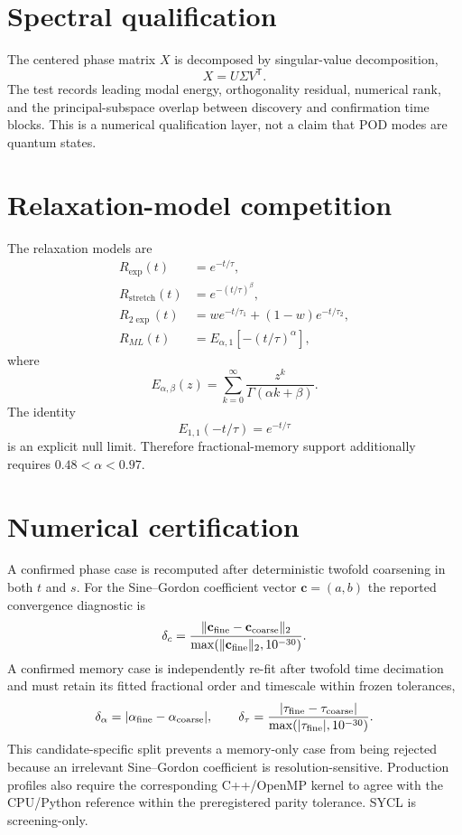 \documentclass[11pt]{article}
\begin{document}
\section{Spectral qualification}
The centered phase matrix $X$ is decomposed by singular-value decomposition,
\begin{equation}
X=U\Sigma V^{\mathsf T}.
\end{equation}
The test records leading modal energy, orthogonality residual, numerical rank, and the principal-subspace overlap between discovery and confirmation time blocks.  This is a numerical qualification layer, not a claim that POD modes are quantum states.

\section{Relaxation-model competition}
The relaxation models are
\begin{align}
R_{\exp}(t)&=e^{-t/\tau},\\
R_{\mathrm{stretch}}(t)&=e^{-(t/\tau)^\beta},\\
R_{2\exp}(t)&=w e^{-t/\tau_1}+(1-w)e^{-t/\tau_2},\\
R_{ML}(t)&=E_{\alpha,1}\!\left[-(t/\tau)^\alpha\right],
\end{align}
where
\begin{equation}
E_{\alpha,\beta}(z)=\sum_{k=0}^{\infty}\frac{z^k}{\Gamma(\alpha k+\beta)}.
\end{equation}
The identity
\begin{equation}
E_{1,1}(-t/\tau)=e^{-t/\tau}
\end{equation}
is an explicit null limit.  Therefore fractional-memory support additionally requires $0.48<\alpha<0.97$.

\section{Numerical certification}
A confirmed phase case is recomputed after deterministic twofold coarsening in both $t$ and $s$.  For the Sine--Gordon coefficient vector $\mathbf c=(a,b)$ the reported convergence diagnostic is
\begin{equation}
\delta_c=\frac{\|\mathbf c_{\rm fine}-\mathbf c_{\rm coarse}\|_2}{\max(\|\mathbf c_{\rm fine}\|_2,10^{-30})}.
\end{equation}
A confirmed memory case is independently re-fit after twofold time decimation and must retain its fitted fractional order and timescale within frozen tolerances,
\begin{equation}
\delta_\alpha=|\alpha_{\rm fine}-\alpha_{\rm coarse}|,
\qquad
\delta_\tau=\frac{|\tau_{\rm fine}-\tau_{\rm coarse}|}{\max(|\tau_{\rm fine}|,10^{-30})}.
\end{equation}
This candidate-specific split prevents a memory-only case from being rejected because an irrelevant Sine--Gordon coefficient is resolution-sensitive.  Production profiles also require the corresponding C++/OpenMP kernel to agree with the CPU/Python reference within the preregistered parity tolerance.  SYCL is screening-only.
\end{document}
